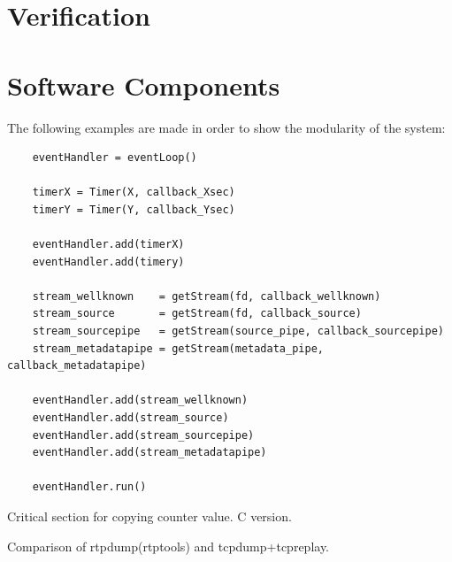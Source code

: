 \section{Verification} \label{sec:implementation:verification}


\section{Software Components}
The following examples are made in order to show the modularity of the system:



\begin{listing}[h] 
\begin{verbatim}
	eventHandler = eventLoop()
	
	timerX = Timer(X, callback_Xsec)
	timerY = Timer(Y, callback_Ysec)
	
	eventHandler.add(timerX)
	eventHandler.add(timery)
	
	stream_wellknown    = getStream(fd, callback_wellknown)
	stream_source       = getStream(fd, callback_source)
	stream_sourcepipe   = getStream(source_pipe, callback_sourcepipe)
	stream_metadatapipe = getStream(metadata_pipe, callback_metadatapipe)	
	
	eventHandler.add(stream_wellknown)
	eventHandler.add(stream_source)
	eventHandler.add(stream_sourcepipe)
	eventHandler.add(stream_metadatapipe)
	
	eventHandler.run()
\end{verbatim}
\caption{Critical section for copying counter value. C version.}
\label{code:critical_section_c}
\end{listing}




Comparison of rtpdump(rtptools) and tcpdump+tcpreplay.

\begin{table}[H]
\centering
{}
\caption{My caption}
\label{my-label}
\end{table}


